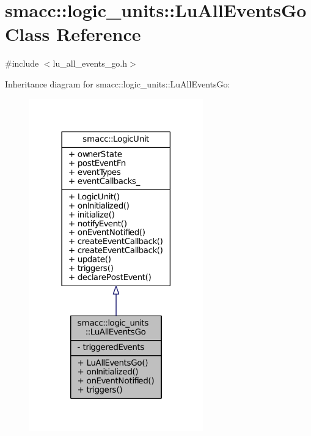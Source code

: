 \hypertarget{classsmacc_1_1logic__units_1_1LuAllEventsGo}{}\section{smacc\+:\+:logic\+\_\+units\+:\+:Lu\+All\+Events\+Go Class Reference}
\label{classsmacc_1_1logic__units_1_1LuAllEventsGo}


{\ttfamily \#include $<$lu\+\_\+all\+\_\+events\+\_\+go.\+h$>$}



Inheritance diagram for smacc\+:\+:logic\+\_\+units\+:\+:Lu\+All\+Events\+Go\+:
\nopagebreak
\begin{figure}[H]
\begin{center}
\leavevmode
\includegraphics[width=213pt]{classsmacc_1_1logic__units_1_1LuAllEventsGo__inherit__graph}
\end{center}
\end{figure}


